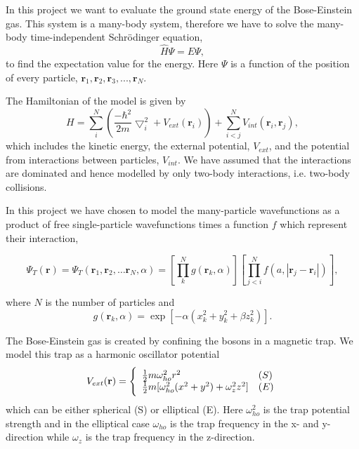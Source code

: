 In this project we want to evaluate the ground state energy of the Bose-Einstein gas. This system is a many-body system, therefore we have to solve the many-body time-independent Schrödinger equation,
\begin{equation}\label{eq:SE}
\hat{H} \Psi = E\Psi,
\end{equation}
to find the expectation value for the energy. Here $\Psi$ is a function of the position of every particle, $\mathbf{r}_1, \mathbf{r}_2, \mathbf{r}_3, ... , \mathbf{r}_N$. 

The Hamiltonian of the model is given by
 \begin{equation}
     H = \sum_i^N \left(\frac{-\hbar^2}{2m}{\bigtriangledown }_{i}^2 +V_{ext}({\mathbf{r}}_i)\right)  +
	 \sum_{i<j}^{N} V_{int}({\mathbf{r}}_i,{\mathbf{r}}_j),
 \end{equation}
which includes the kinetic energy, the external potential, $V_{ext}$, and the potential from interactions between particles, $V_{int}$. We have assumed that the interactions are dominated and hence modelled by only two-body interactions, i.e. two-body collisions.

In this project we have chosen to model the many-particle wavefunctions as a product of free single-particle wavefunctions times a function $f$ which represent their interaction,

 \begin{equation}
 \Psi_T(\mathbf{r})=\Psi_T(\mathbf{r}_1, \mathbf{r}_2, \dots \mathbf{r}_N,\alpha)
 =\left[
    \prod^N_k g(\mathbf{r}_k, \alpha)
 \right]
 \left[
    \prod_{j<i}^Nf(a,|\mathbf{r}_j-\mathbf{r}_i|)
 \right],
 \label{eq:trialwf}
 \end{equation}

where $N$ is the number of particles and 
 \begin{equation}\label{eq:phi}
    g(\mathbf{r}_k, \alpha)= \exp{[-\alpha(x_k^2+y_k^2+\beta z_k^2)]}.
 \end{equation}

The Bose-Einstein gas is created by confining the bosons in a magnetic trap. We model this trap as a harmonic oscillator potential 
\begin{equation}
 V_{ext}(\mathbf{r}) = 
 \Bigg\{
 \begin{array}{ll}
	 \frac{1}{2}m\omega_{ho}^2r^2 & (S)\\
 \strut
	 \frac{1}{2}m[\omega_{ho}^2(x^2+y^2) + \omega_z^2z^2] & (E)
 \label{eq:trap_eqn}
 \end{array}
 \end{equation}
which can be either spherical (S) or elliptical (E). Here $\omega^2_{ho}$ is the trap potential strength and in the elliptical case $\omega_{ho}$ is the trap frequency in the x- and y- direction while $\omega_z$ is the trap frequency in the z-direction.
 
